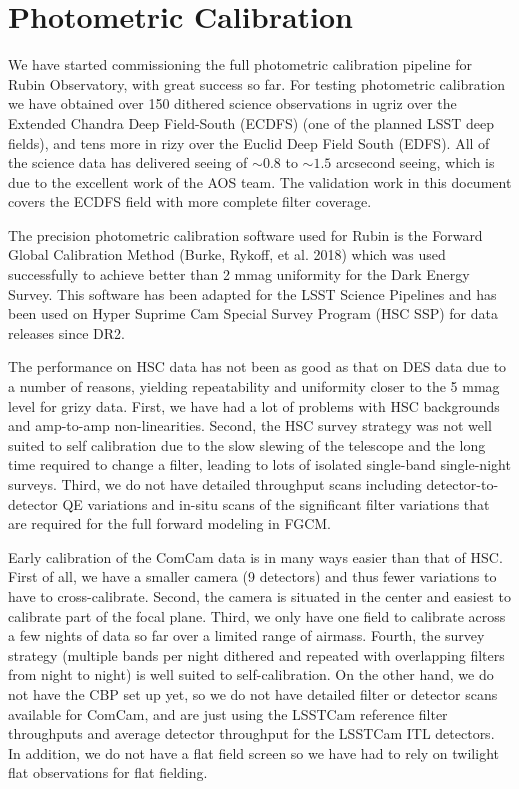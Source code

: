 \section{Photometric Calibration}
\label{sec:photometric_calibration}

We have started commissioning the full photometric calibration pipeline for
Rubin Observatory, with great success so far. For testing photometric
calibration we have obtained over 150 dithered science observations in ugriz
over the Extended Chandra Deep Field-South (ECDFS) (one of the planned LSST
deep fields), and tens more in rizy over the Euclid Deep Field South
(EDFS). All of the science data has delivered seeing of $\sim0.8$ to $\sim1.5$
arcsecond seeing, which is due to the excellent work of the AOS team.  The
validation work in this document covers the ECDFS field with more complete
filter coverage.

The precision photometric calibration software used for Rubin is the Forward
Global Calibration Method (Burke, Rykoff, et al. 2018) which was used
successfully to achieve better than 2 mmag uniformity for the Dark Energy
Survey. This software has been adapted for the LSST Science Pipelines and has
been used on Hyper Suprime Cam Special Survey Program (HSC SSP) for data
releases since DR2.

The performance on HSC data has not been as good as that on DES data due to a
number of reasons, yielding repeatability and uniformity closer to the 5 mmag
level for grizy data.  First, we have had a lot of problems with HSC
backgrounds and amp-to-amp non-linearities.  Second, the HSC survey strategy
was not well suited to self calibration due to the slow slewing of the
telescope and the long time required to change a filter, leading to lots of
isolated single-band single-night surveys.  Third, we do not have detailed
throughput scans including detector-to-detector QE variations and in-situ scans
of the significant filter variations that are required for the full forward
modeling in FGCM.

Early calibration of the ComCam data is in many ways easier than that of HSC.
First of all, we have a smaller camera (9 detectors) and thus fewer variations
to have to cross-calibrate.  Second, the camera is situated in the center and
easiest to calibrate part of the focal plane.  Third, we only have one field to
calibrate across a few nights of data so far over a limited range of airmass.
Fourth, the survey strategy (multiple bands per night dithered and repeated
with overlapping filters from night to night) is well suited to
self-calibration.  On the other hand, we do not have the CBP set up yet, so we
do not have detailed filter or detector scans available for ComCam, and are
just using the LSSTCam reference filter throughputs and average detector
throughput for the LSSTCam ITL detectors.  In addition, we do not have a flat
field screen so we have had to rely on twilight flat observations for flat fielding.

